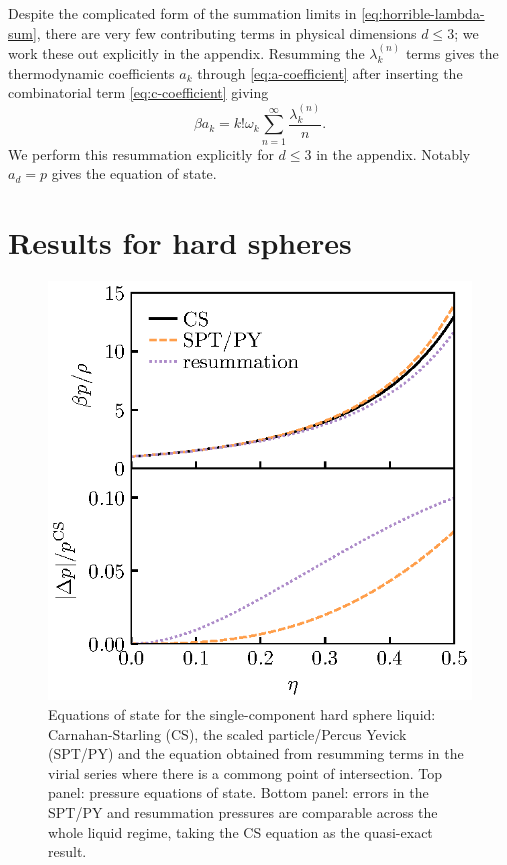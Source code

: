\documentclass[11pt,twoside]{report}
\begin{document}
Despite the complicated form of the summation limits in \eqref{eq:horrible-lambda-sum}, there are very few contributing terms in physical dimensions $d \le 3$; we work these out explicitly in the appendix.
Resumming the $\lambda_k^{(n)}$ terms gives the thermodynamic coefficients $a_k$ through \eqref{eq:a-coefficient} after inserting the combinatorial term \eqref{eq:c-coefficient} giving
\begin{equation}\label{eq:final-a-coefficient}
  \beta a_k = k! \omega_k \sum_{n=1}^\infty \frac{\lambda_k^{(n)}}{n}.
\end{equation}
We perform this resummation explicitly for $d \le 3$ in the appendix.
Notably $a_d = p$ gives the equation of state.

\section{Results for hard spheres}

\begin{figure}
  \includegraphics[width=0.9\linewidth,outer]{resummation-pressure}
  \caption[Accuracy of equation of state from partially resumming the virial series]{
    Equations of state for the single-component hard sphere liquid: Carnahan-Starling (CS), the scaled particle/Percus Yevick (SPT/PY) and the equation obtained from resumming terms in the virial series where there is a commong point of intersection.
    Top panel: pressure equations of state.
  Bottom panel: errors in the SPT/PY and resummation pressures are comparable across the whole liquid regime, taking the CS equation as the quasi-exact result.}
  \label{fig:resummation-pressure}
\end{figure}
\end{document}
